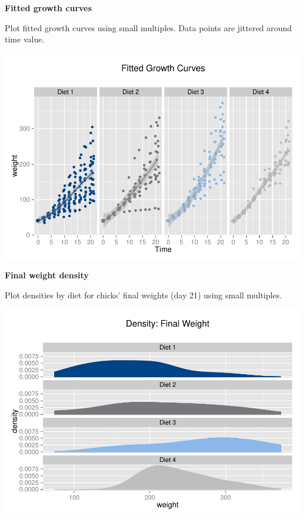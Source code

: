 \documentclass[10pt]{article}
\newenvironment{CodeChunk}{}{}
\begin{document}
\textbf{Fitted growth curves}

Plot fitted growth curves using small multiples. Data points are
jittered around time value.

\begin{CodeChunk}

\includegraphics{ReproducibleResearchDemo_files/figure-latex/unnamed-chunk-11-1} \end{CodeChunk}

\textbf{Final weight density}

Plot densities by diet for chicks' final weights (day 21) using small
multiples.

\begin{CodeChunk}

\includegraphics{ReproducibleResearchDemo_files/figure-latex/unnamed-chunk-12-1} \end{CodeChunk}
\end{document}
